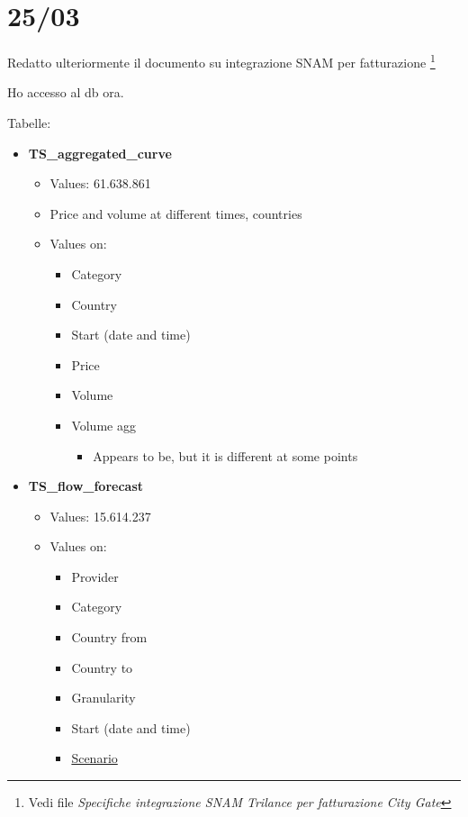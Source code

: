 \section{25/03}
    Redatto ulteriormente il documento su integrazione SNAM per fatturazione \footnote{Vedi file \textit{Specifiche integrazione SNAM Trilance per fatturazione City Gate}}
    
    Ho accesso al db ora.

    Tabelle:
    \begin{itemize}
        \item \textbf{TS\_aggregated\_curve}
        \begin{itemize}
            \item Values: 61.638.861
            
            \item Price and volume at different times, countries
            
            \item Values on:
            \begin{itemize}
                \item Category
                \item Country
                \item Start (date and time)
                \item Price
                \item Volume
                \item Volume agg
                \begin{itemize}
                    \item Appears to be, but it is different at some points
                \end{itemize}
            \end{itemize}
        \end{itemize}
        
        \item \textbf{TS\_flow\_forecast}
        \begin{itemize}
            \item Values: 15.614.237
            
            \item Values on:
            \begin{itemize}
                \item Provider
                \item Category
                \item Country from
                \item Country to
                \item Granularity
                \item Start (date and time)
                \item \underline{Scenario}
            \end{itemize}
            

\end{itemize}
\end{itemize}
